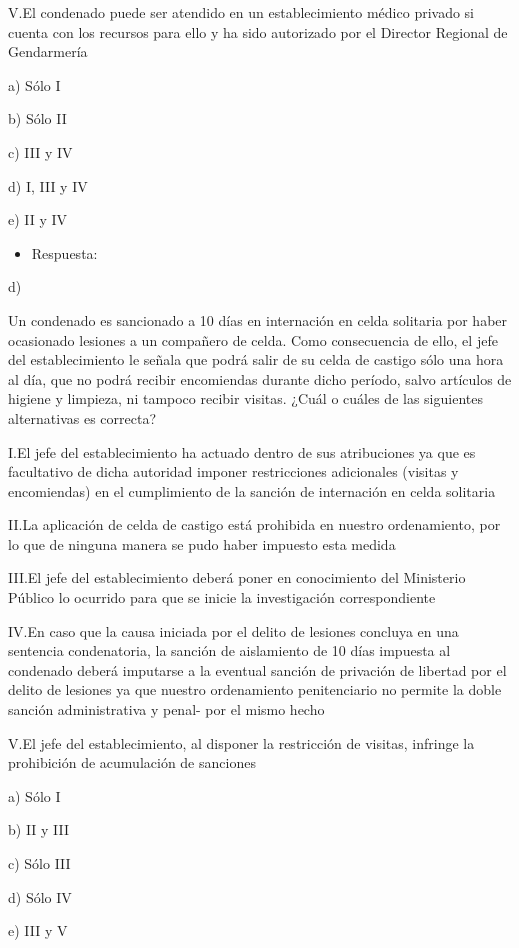 \documentclass[letterpaper, 11pt]{article}
\begin{document}
V.El condenado puede ser atendido en un establecimiento médico privado si cuenta
con los recursos para ello y ha sido autorizado por el Director Regional de
Gendarmería

a) Sólo I

b) Sólo II

c) III y IV

d) I, III y IV

e) II y IV

\begin{itemize}
\item Respuesta:
\end{itemize}
d)

Un condenado es sancionado a 10 días en internación en celda solitaria por
haber ocasionado lesiones a un compañero de celda. Como consecuencia de
ello, el jefe del establecimiento le señala que podrá salir de su celda de castigo
sólo una hora al día, que no podrá recibir encomiendas durante dicho período,
salvo artículos de higiene y limpieza, ni tampoco recibir visitas. ¿Cuál o cuáles
de las siguientes alternativas es correcta?

I.El jefe del establecimiento ha actuado dentro de sus atribuciones ya que es
facultativo de dicha autoridad imponer restricciones adicionales (visitas y
encomiendas) en el cumplimiento de la sanción de internación en celda solitaria

II.La aplicación de celda de castigo está prohibida en nuestro ordenamiento, por lo
que de ninguna manera se pudo haber impuesto esta medida

III.El jefe del establecimiento deberá poner en conocimiento del Ministerio Público lo
ocurrido para que se inicie la investigación correspondiente

IV.En caso que la causa iniciada por el delito de lesiones concluya en una sentencia
condenatoria, la sanción de aislamiento de 10 días impuesta al condenado deberá
imputarse a la eventual sanción de privación de libertad por el delito de lesiones ya
que nuestro ordenamiento penitenciario no permite la doble sanción administrativa y penal- por el mismo hecho

V.El jefe del establecimiento, al disponer la restricción de visitas, infringe la
prohibición de acumulación de sanciones

a) Sólo I

b) II y III

c) Sólo III

d) Sólo IV

e) III y V
\end{document}
